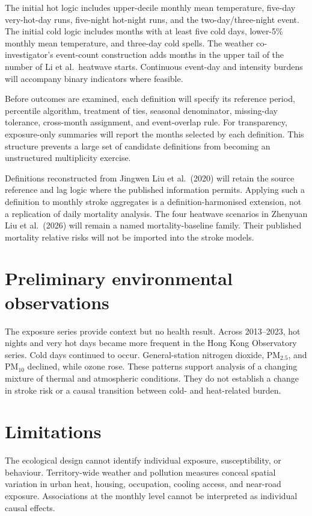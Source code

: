 \documentclass[11pt,a4paper]{article}
\begin{document}
The initial hot logic includes upper-decile monthly mean temperature, five-day very-hot-day runs, five-night hot-night runs, and the two-day/three-night event. The initial cold logic includes months with at least five cold days, lower-5\% monthly mean temperature, and three-day cold spells. The weather co-investigator's event-count construction adds months in the upper tail of the number of Li et al.\ heatwave starts. Continuous event-day and intensity burdens will accompany binary indicators where feasible.

Before outcomes are examined, each definition will specify its reference period, percentile algorithm, treatment of ties, seasonal denominator, missing-day tolerance, cross-month assignment, and event-overlap rule. For transparency, exposure-only summaries will report the months selected by each definition. This structure prevents a large set of candidate definitions from becoming an unstructured multiplicity exercise.

Definitions reconstructed from Jingwen Liu et al.\ (2020) will retain the source reference and lag logic where the published information permits. Applying such a definition to monthly stroke aggregates is a definition-harmonised extension, not a replication of daily mortality analysis. The four heatwave scenarios in Zhenyuan Liu et al.\ (2026) will remain a named mortality-baseline family. Their published mortality relative risks will not be imported into the stroke models.

\section{Preliminary environmental observations}

The exposure series provide context but no health result. Across 2013--2023, hot nights and very hot days became more frequent in the Hong Kong Observatory series. Cold days continued to occur. General-station nitrogen dioxide, PM$_{2.5}$, and PM$_{10}$ declined, while ozone rose. These patterns support analysis of a changing mixture of thermal and atmospheric conditions. They do not establish a change in stroke risk or a causal transition between cold- and heat-related burden.

\section{Limitations}

The ecological design cannot identify individual exposure, susceptibility, or behaviour. Territory-wide weather and pollution measures conceal spatial variation in urban heat, housing, occupation, cooling access, and near-road exposure. Associations at the monthly level cannot be interpreted as individual causal effects.
\end{document}
